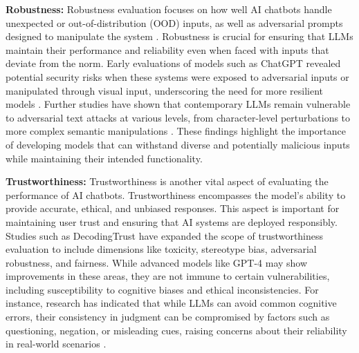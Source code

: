 \textbf{Robustness:} Robustness evaluation focuses on how well AI chatbots handle unexpected or out-of-distribution (OOD) inputs, as well as adversarial prompts designed to manipulate the system \cite{wang2022generalizing}. Robustness is crucial for ensuring that LLMs maintain their performance and reliability even when faced with inputs that deviate from the norm. Early evaluations of models such as ChatGPT revealed potential security risks when these systems were exposed to adversarial inputs or manipulated through visual input, underscoring the need for more resilient models \cite{yang2022glue}. Further studies have shown that contemporary LLMs remain vulnerable to adversarial text attacks at various levels, from character-level perturbations to more complex semantic manipulations \cite{zhu2023promptbench}. These findings highlight the importance of developing models that can withstand diverse and potentially malicious inputs while maintaining their intended functionality.

\textbf{Trustworthiness:} Trustworthiness is another vital aspect of evaluating the performance of AI chatbots. Trustworthiness encompasses the model's ability to provide accurate, ethical, and unbiased responses. This aspect is important for maintaining user trust and ensuring that AI systems are deployed responsibly. Studies such as DecodingTrust have expanded the scope of trustworthiness evaluation to include dimensions like toxicity, stereotype bias, adversarial robustness, and fairness. While advanced models like GPT-4 may show improvements in these areas, they are not immune to certain vulnerabilities, including susceptibility to cognitive biases and ethical inconsistencies. For instance, research has indicated that while LLMs can avoid common cognitive errors, their consistency in judgment can be compromised by factors such as questioning, negation, or misleading cues, raising concerns about their reliability in real-world scenarios \cite{wang2023decodingtrust}.

